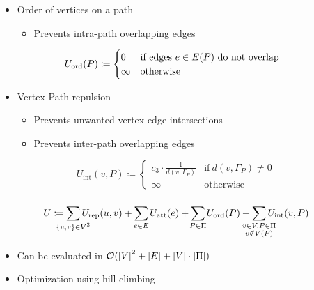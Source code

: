 \begin{frame}
  \frametitle{\insertsubsection}
  \begin{itemize}
    \item Order of vertices on a path \begin{itemize}
      \item Prevents intra-path overlapping edges
    \end{itemize}
  \end{itemize}
  \begin{equation*}
    U_\text{ord}(P) \coloneqq \begin{cases}
      0 & \text{if edges ${e \in E(P)}$ do not overlap} \\
      \infty & \text{otherwise}
    \end{cases} \hspace{0.25cm}
  \end{equation*}
  \begin{itemize}
    \item Vertex-Path repulsion \begin{itemize}
      \item Prevents unwanted vertex-edge intersections
      \item Prevents inter-path overlapping edges
    \end{itemize}
  \end{itemize}
  \begin{equation*}
    U_\text{int}(v, P) \coloneqq \begin{cases}
      c_3 \cdot \frac{1}{d(v, \Gamma_P)} & \text{if}~d(v, \Gamma_P) \neq 0 \\
      \infty & \text{otherwise}
    \end{cases}
  \end{equation*}
\end{frame}


\begin{frame}
  \frametitle{\insertsubsection}
  \begin{equation*}
  U \coloneqq
  \sum_{\mathclap{\substack{\lbrace u, v \rbrace \in V^2}}} U_\text{rep}(u, v)
  +
  \sum_{\mathclap{\substack{e \in E}}} U_\text{att}(e)
  +
  \sum_{\mathclap{\substack{P \in \Pi}}} U_\text{ord}(P)
  +
  \sum_{\mathclap{\substack{v \in V, P \in \Pi \\ v \notin V(P)}}} U_\text{int}(v, P)
  \end{equation*}
  \begin{itemize}
    \item Can be evaluated in ${\mathcal{O}(\left\lvert V\right\rvert^2 + \left\lvert E\right\rvert + \left\lvert V\right\rvert \cdot \left\lvert\Pi\right\rvert)}$
    \item Optimization using hill climbing
  \end{itemize}
\end{frame}
